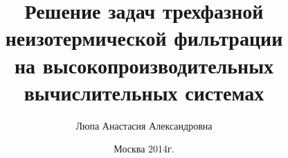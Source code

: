 \documentclass[10pt,pdf,hyperref={unicode}, color=usenames,dvipsnames]{beamer} %
\title{ Решение задач трехфазной неизотермической фильтрации \\
на высокопроизводительных вычислительных системах}
\author{Люпа Анастасия Александровна}
\institute{Московский физико-технический институт \\
(государственный университет)\\
Факультет управления и прикладной математики \\
Кафедра математического моделирования \\
    \vspace{0.2cm}
    Научный руководитель: с.н.с., к.ф.-м.н. Чурбанова Н.Г.\\
}
\date{
    Москва 2014г.
}
\begin{document}
\begin{frame}
  \maketitle
\end{frame}






\end{document}
